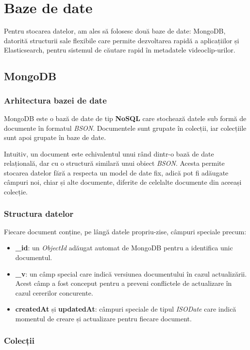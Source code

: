 \section{Baze de date}
Pentru stocarea datelor, am ales să folosesc două baze de date: MongoDB, datorită structurii sale
flexibile care permite dezvoltarea rapidă a aplicațiilor și Elasticsearch, pentru sistemul de căutare
rapid în metadatele videoclip-urilor.
\subsection{MongoDB}
\subsubsection{Arhitectura bazei de date}
MongoDB este o bază de date de tip \textbf{NoSQL} care stochează datele sub formă de documente în 
formatul \textit{BSON}. Documentele sunt grupate în colecții, iar colecțiile sunt apoi grupate în
baze de date. 
\par
Intuitiv, un document este echivalentul unui rând dintr-o bază de date relațională, dar cu o structură
similară unui obiect \textit{BSON}. Acesta permite stocarea datelor fără a respecta un model de date fix, adică
pot fi adăugate câmpuri noi, chiar și alte documente, diferite de celelalte documente din aceeași colecție.

\subsubsection{Structura datelor}

\par
Fiecare document conține, pe lângă datele propriu-zise, câmpuri speciale precum:
\begin{itemize}
    \item \textbf{\_id}: un \textit{ObjectId} adăugat automat de MongoDB pentru a identifica unic documentul.
    \item \textbf{\_v}: un câmp special care indică versiunea documentului în cazul actualizării. Acest
    câmp a fost conceput pentru a preveni conflictele de actualizare în cazul cererilor concurente.
    \item \textbf{createdAt} și \textbf{updatedAt}: câmpuri speciale de tipul \textit{ISODate} care
    indică momentul de creare și actualizare pentru fiecare document.
\end{itemize}

\subsubsection{Colecții}

